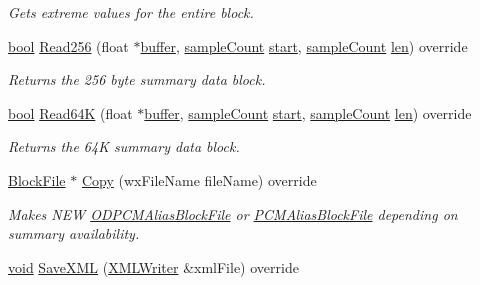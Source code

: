 \begin{DoxyCompactItemize}
\begin{DoxyCompactList}\small\item\em Gets extreme values for the entire block. \end{DoxyCompactList}\item 
\hyperlink{mac_2config_2i386_2lib-src_2libsoxr_2soxr-config_8h_abb452686968e48b67397da5f97445f5b}{bool} \hyperlink{class_o_d_decode_block_file_a83cd4407475d246550770848437fffa5}{Read256} (float $\ast$\hyperlink{structbuffer}{buffer}, \hyperlink{include_2audacity_2_types_8h_afa427e1f521ea5ec12d054e8bd4d0f71}{sample\+Count} \hyperlink{seqread_8c_ac503262ae470564980711da4f78b1181}{start}, \hyperlink{include_2audacity_2_types_8h_afa427e1f521ea5ec12d054e8bd4d0f71}{sample\+Count} \hyperlink{lib_2expat_8h_af86d325fecfc8f47b61fbf5a5146f582}{len}) override
\begin{DoxyCompactList}\small\item\em Returns the 256 byte summary data block. \end{DoxyCompactList}\item 
\hyperlink{mac_2config_2i386_2lib-src_2libsoxr_2soxr-config_8h_abb452686968e48b67397da5f97445f5b}{bool} \hyperlink{class_o_d_decode_block_file_a57b1b6efaee2a4d3023c2c9a6c9edb4c}{Read64K} (float $\ast$\hyperlink{structbuffer}{buffer}, \hyperlink{include_2audacity_2_types_8h_afa427e1f521ea5ec12d054e8bd4d0f71}{sample\+Count} \hyperlink{seqread_8c_ac503262ae470564980711da4f78b1181}{start}, \hyperlink{include_2audacity_2_types_8h_afa427e1f521ea5ec12d054e8bd4d0f71}{sample\+Count} \hyperlink{lib_2expat_8h_af86d325fecfc8f47b61fbf5a5146f582}{len}) override
\begin{DoxyCompactList}\small\item\em Returns the 64K summary data block. \end{DoxyCompactList}\item 
\hyperlink{class_block_file}{Block\+File} $\ast$ \hyperlink{class_o_d_decode_block_file_a5ea414424dadcc1a7120a48bb535b871}{Copy} (wx\+File\+Name file\+Name) override
\begin{DoxyCompactList}\small\item\em Makes N\+EW \hyperlink{class_o_d_p_c_m_alias_block_file}{O\+D\+P\+C\+M\+Alias\+Block\+File} or \hyperlink{class_p_c_m_alias_block_file}{P\+C\+M\+Alias\+Block\+File} depending on summary availability. \end{DoxyCompactList}\item 
\hyperlink{sound_8c_ae35f5844602719cf66324f4de2a658b3}{void} \hyperlink{class_o_d_decode_block_file_af6a1047c0871303b4e5ea39bf2ea5cae}{Save\+X\+ML} (\hyperlink{class_x_m_l_writer}{X\+M\+L\+Writer} \&xml\+File) override

\end{DoxyCompactItemize}

